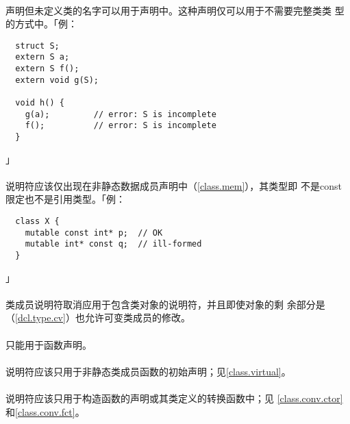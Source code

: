 \paragraph{}
声明但未定义类的名字可以用于声明中。这种声明仅可以用于不需要完整类类
型的方式中。「例：
\begin{lstlisting}
  struct S;
  extern S a;
  extern S f();
  extern void g(S);

  void h() {
    g(a);         // error: S is incomplete
    f();          // error: S is incomplete
  }
\end{lstlisting}」

\paragraph{}
说明符应该仅出现在非静态数据成员声明中（\ref{class.mem}），其类型即
不是const限定也不是引用类型。「例：
\begin{lstlisting}
  class X {
    mutable const int* p;  // OK
    mutable int* const q;  // ill-formed
  }
\end{lstlisting}」

\paragraph{}
类成员说明符取消应用于包含类对象的说明符，并且即使对象的剩
余部分是（\ref{dcl.type.cv}）也允许可变类成员的修改。

\paragraph{}
只能用于函数声明。


\paragraph{}
说明符应该只用于非静态类成员函数的初始声明；见\ref{class.virtual}。

\paragraph{}
说明符应该只用于构造函数的声明或其类定义的转换函数中；见
\ref{class.conv.ctor}和\ref{class.conv.fct}。

